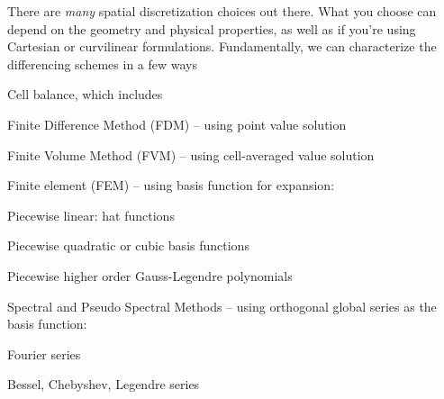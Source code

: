 \documentclass[12pt]{article}
\begin{document}
There are \textit{many} spatial discretization choices out there. What you choose can depend on the geometry and physical properties, as well as if you're using Cartesian or curvilinear formulations. Fundamentally, we can characterize the differencing schemes in a few ways
\begin{compactitem}
\item Cell balance, which includes
  \begin{compactitem}
  \item Finite Difference Method (FDM) -- using point value solution	
  \item Finite Volume Method (FVM) -- using cell-averaged value solution
  \end{compactitem}	
\item Finite element (FEM) -- using basis function for expansion:	
  \begin{compactitem}
  \item Piecewise linear: hat functions	
  \item Piecewise quadratic or cubic basis functions	
  \item Piecewise higher order Gauss-Legendre polynomials	
  \end{compactitem}
\item Spectral and Pseudo Spectral Methods -- using orthogonal global series as the basis function:	
  \begin{compactitem}
  \item Fourier series	
  \item Bessel, Chebyshev, Legendre series
  \end{compactitem}
\end{compactitem}
\end{document}
